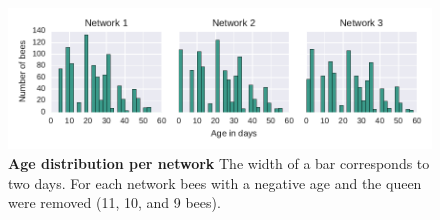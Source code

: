 \begin{figure}[htb]
	\centering
	\includegraphics[width=1.0\textwidth]{Figures/ages}
	\caption[Age distribution per network]{\textbf{Age distribution per network} The width of a bar corresponds to two days. For each network bees with a negative age and the queen were removed (11, 10, and 9 bees).}
	\label{fig:ages}
\end{figure}
